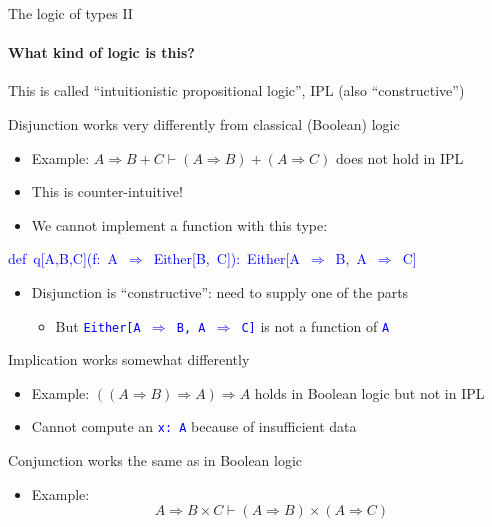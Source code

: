\documentclass[english]{beamer}
\newenvironment{lyxcode}
   {\par\begin{list}{}{
     \setlength{\rightmargin}{\leftmargin}
     \setlength{\listparindent}{0pt}%
     \raggedright
     \setlength{\itemsep}{0pt}
     \setlength{\parsep}{0pt}
     \normalfont\ttfamily}%
    \def\{{\char`\{}
    \def\}{\char`\}}
    \def\textasciitilde{\char`\~}
    \item[]}
   {\end{list}}
\begin{document}
\begin{frame}{The logic of types II}


\framesubtitle{What kind of logic is this?}

This is called ``intuitionistic propositional logic'', IPL (also
``constructive'')
\begin{itemize}
\item Disjunction works very differently from classical (Boolean) logic
\begin{itemize}
\item Example: $A\Rightarrow B+C\vdash(A\Rightarrow B)+(A\Rightarrow C)$
does not hold in IPL
\item This is counter-intuitive!
\item We cannot implement a function with this type:
\end{itemize}
\begin{lyxcode}
\textcolor{blue}{\footnotesize{}def~q{[}A,B,C{]}(f:~A~$\Rightarrow$~Either{[}B,~C{]}):~Either{[}A~$\Rightarrow$~B,~A~$\Rightarrow$~C{]}}{\footnotesize \par}
\end{lyxcode}
\begin{itemize}
\item Disjunction is ``constructive'': need to supply one of the parts
\begin{itemize}
\item But \texttt{\textcolor{blue}{\footnotesize{}Either{[}A $\Rightarrow$
B, A $\Rightarrow$ C{]}}} is not a function of \texttt{\textcolor{blue}{\footnotesize{}A}} 
\end{itemize}
\end{itemize}
\item Implication works somewhat differently
\begin{itemize}
\item Example: $\left(\left(A\Rightarrow B\right)\Rightarrow A\right)\Rightarrow A$
holds in Boolean logic but not in IPL
\item Cannot compute an \texttt{\textcolor{blue}{\footnotesize{}x:\ A}}
because of insufficient data
\end{itemize}
\item Conjunction works the same as in Boolean logic
\begin{itemize}
\item Example: 
\[
A\Rightarrow B\times C\vdash\left(A\Rightarrow B\right)\times\left(A\Rightarrow C\right)
\]
 
\end{itemize}
\end{itemize}
\end{frame}
\end{document}
